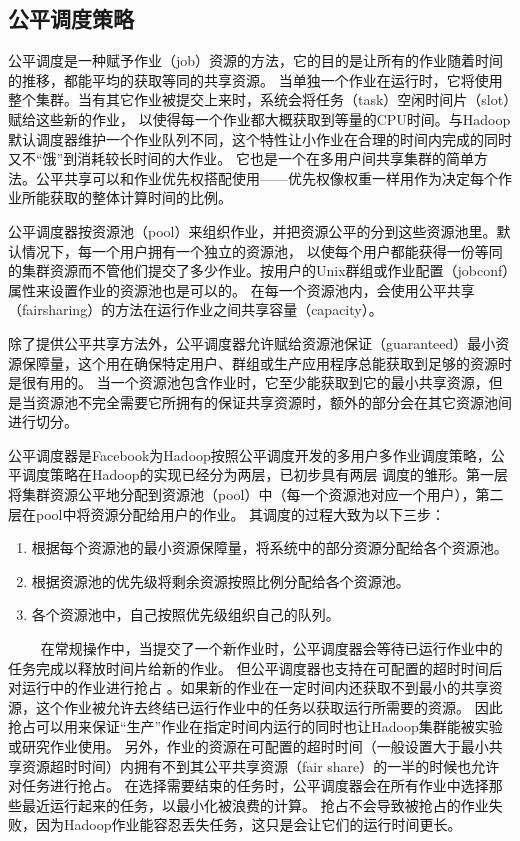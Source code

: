 \subsection{公平调度策略}
公平调度是一种赋予作业（job）资源的方法，它的目的是让所有的作业随着时间的推移，都能平均的获取等同的共享资源。
当单独一个作业在运行时，它将使用整个集群。当有其它作业被提交上来时，系统会将任务（task）空闲时间片（slot）赋给这些新的作业，
以使得每一个作业都大概获取到等量的CPU时间。与Hadoop默认调度器维护一个作业队列不同，这个特性让小作业在合理的时间内完成的同时又不“饿”到消耗较长时间的大作业。
它也是一个在多用户间共享集群的简单方法。公平共享可以和作业优先权搭配使用——优先权像权重一样用作为决定每个作业所能获取的整体计算时间的比例。

公平调度器按资源池（pool）来组织作业，并把资源公平的分到这些资源池里。默认情况下，每一个用户拥有一个独立的资源池，
以使每个用户都能获得一份等同的集群资源而不管他们提交了多少作业。按用户的Unix群组或作业配置（jobconf）属性来设置作业的资源池也是可以的。
在每一个资源池内，会使用公平共享（fairsharing）的方法在运行作业之间共享容量（capacity）。

除了提供公平共享方法外，公平调度器允许赋给资源池保证（guaranteed）最小资源保障量，这个用在确保特定用户、群组或生产应用程序总能获取到足够的资源时是很有用的。
当一个资源池包含作业时，它至少能获取到它的最小共享资源，但是当资源池不完全需要它所拥有的保证共享资源时，额外的部分会在其它资源池间进行切分。

公平调度器是Facebook为Hadoop按照公平调度开发的多用户多作业调度策略，公平调度策略在Hadoop的实现已经分为两层，已初步具有两层
调度的雏形。第一层将集群资源公平地分配到资源池（pool）中（每一个资源池对应一个用户），第二层在pool中将资源分配给用户的作业。
其调度的过程大致为以下三步：
\begin{enumerate}
\item 根据每个资源池的最小资源保障量，将系统中的部分资源分配给各个资源池。
\item 根据资源池的优先级将剩余资源按照比例分配给各个资源池。
\item 各个资源池中，自己按照优先级组织自己的队列。
\end{enumerate}
　　
在常规操作中，当提交了一个新作业时，公平调度器会等待已运行作业中的任务完成以释放时间片给新的作业。
但公平调度器也支持在可配置的超时时间后对运行中的作业进行抢占
。如果新的作业在一定时间内还获取不到最小的共享资源，这个作业被允许去终结已运行作业中的任务以获取运行所需要的资源。
因此抢占可以用来保证“生产”作业在指定时间内运行的同时也让Hadoop集群能被实验或研究作业使用。
另外，作业的资源在可配置的超时时间（一般设置大于最小共享资源超时时间）内拥有不到其公平共享资源（fair share）的一半的时候也允许对任务进行抢占。
在选择需要结束的任务时，公平调度器会在所有作业中选择那些最近运行起来的任务，以最小化被浪费的计算。
抢占不会导致被抢占的作业失败，因为Hadoop作业能容忍丢失任务，这只是会让它们的运行时间更长。
